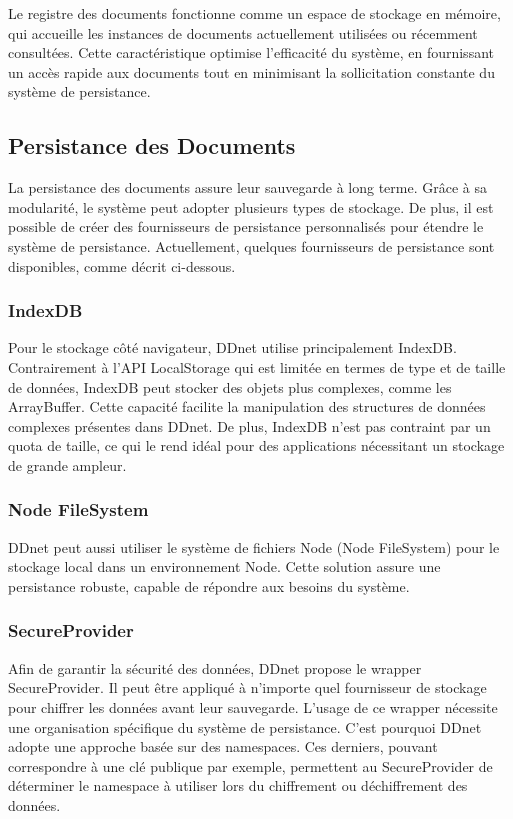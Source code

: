 Le registre des documents fonctionne comme un espace de stockage en mémoire, qui accueille les instances de documents actuellement utilisées ou récemment consultées. Cette caractéristique optimise l'efficacité du système, en fournissant un accès rapide aux documents tout en minimisant la sollicitation constante du système de persistance.

\subsection{Persistance des Documents}

La persistance des documents assure leur sauvegarde à long terme. Grâce à sa modularité, le système peut adopter plusieurs types de stockage. De plus, il est possible de créer des fournisseurs de persistance personnalisés pour étendre le système de persistance. Actuellement, quelques fournisseurs de persistance sont disponibles, comme décrit ci-dessous.

\subsubsection{IndexDB}

Pour le stockage côté navigateur, \Gls{DDnet} utilise principalement IndexDB. Contrairement à l'API LocalStorage qui est limitée en termes de type et de taille de données, IndexDB peut stocker des objets plus complexes, comme les ArrayBuffer. Cette capacité facilite la manipulation des structures de données complexes présentes dans \Gls{DDnet}. De plus, IndexDB n'est pas contraint par un quota de taille, ce qui le rend idéal pour des applications nécessitant un stockage de grande ampleur.

\subsubsection{Node FileSystem}

\Gls{DDnet} peut aussi utiliser le système de fichiers Node (Node FileSystem) pour le stockage local dans un environnement Node. Cette solution assure une persistance robuste, capable de répondre aux besoins du système.

\subsubsection{SecureProvider}

Afin de garantir la sécurité des données, \Gls{DDnet} propose le wrapper SecureProvider. Il peut être appliqué à n'importe quel fournisseur de stockage pour chiffrer les données avant leur sauvegarde. L'usage de ce wrapper nécessite une organisation spécifique du système de persistance. C'est pourquoi \Gls{DDnet} adopte une approche basée sur des namespaces. Ces derniers, pouvant correspondre à une clé publique par exemple, permettent au SecureProvider de déterminer le namespace à utiliser lors du chiffrement ou déchiffrement des données.

